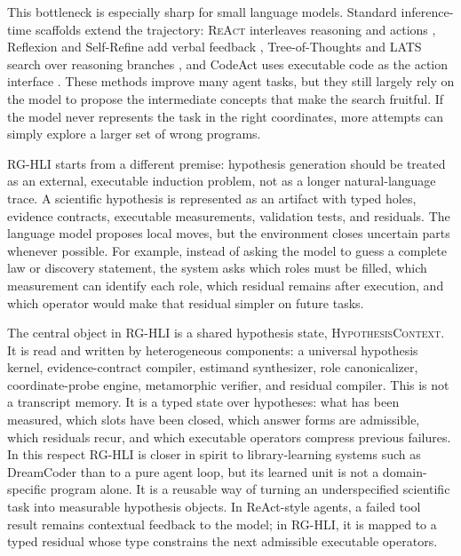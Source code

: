 \documentclass[letterpaper]{article}
\newcommand{\methodshort}{\textsc{RG-HLI}\xspace}
\newcommand{\react}{\textsc{ReAct}\xspace}
\newcommand{\codeact}{CodeAct\xspace}
\begin{document}
This bottleneck is especially sharp for small language models. Standard
inference-time scaffolds extend the trajectory: \react interleaves reasoning
and actions \citep{react}, Reflexion and Self-Refine add verbal feedback
\citep{reflexion,selfrefine}, Tree-of-Thoughts and LATS search over reasoning
branches \citep{tot,lats}, and \codeact uses executable code as the action
interface \citep{codeact}. These methods improve many agent tasks, but they
still largely rely on the model to propose the intermediate concepts that make
the search fruitful. If the model never represents the task in the right
coordinates, more attempts can simply explore a larger set of wrong programs.

\methodshort starts from a different premise: hypothesis generation should be treated
as an external, executable induction problem, not as a longer natural-language
trace. A scientific hypothesis is represented as an artifact with typed holes,
evidence contracts, executable measurements, validation tests, and residuals.
The language model proposes local moves, but the environment closes uncertain
parts whenever possible. For example, instead of asking the model to guess a
complete law or discovery statement, the system asks which roles must be filled,
which measurement can identify each role, which residual remains after
execution, and which operator would make that residual simpler on future tasks.

The central object in \methodshort is a shared hypothesis state, \textsc{HypothesisContext}.
It is read and written by heterogeneous components: a universal hypothesis
kernel, evidence-contract compiler, estimand synthesizer, role canonicalizer,
coordinate-probe engine, metamorphic verifier, and residual compiler. This is
not a transcript memory. It is a typed state over hypotheses: what has been
measured, which slots have been closed, which answer forms are admissible,
which residuals recur, and which executable operators compress previous
failures. In this respect \methodshort is closer in spirit to library-learning systems
such as DreamCoder \citep{dreamcoder} than to a pure agent loop, but its learned
unit is not a domain-specific program alone. It is a reusable way of
turning an underspecified scientific task into measurable hypothesis objects.
In ReAct-style agents, a failed tool result remains contextual feedback to the
model; in \methodshort, it is mapped to a typed residual whose type constrains the
next admissible executable operators.
\end{document}
